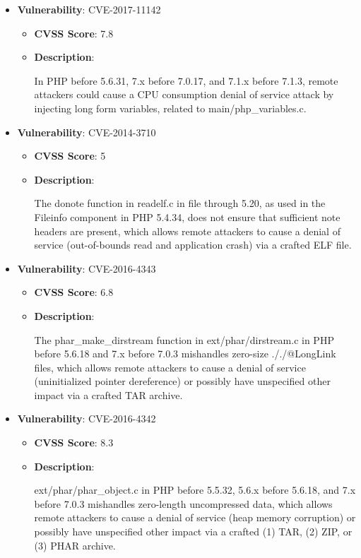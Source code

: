 \documentclass{article}
\begin{document}
\begin{itemize}
        \item \textbf{Vulnerability}: CVE-2017-11142
        \begin{itemize}
            \item \textbf{CVSS Score}:  7.8 
            \item \textbf{Description}:
            \parbox[t]{0.9\linewidth}{
                \ttfamily In PHP before 5.6.31, 7.x before 7.0.17, and 7.1.x before 7.1.3, remote attackers could cause a CPU consumption denial of service attack by injecting long form variables, related to main/php\_variables.c.
            }
        \end{itemize}
    
        \item \textbf{Vulnerability}: CVE-2014-3710
        \begin{itemize}
            \item \textbf{CVSS Score}:  5 
            \item \textbf{Description}:
            \parbox[t]{0.9\linewidth}{
                \ttfamily The donote function in readelf.c in file through 5.20, as used in the Fileinfo component in PHP 5.4.34, does not ensure that sufficient note headers are present, which allows remote attackers to cause a denial of service (out-of-bounds read and application crash) via a crafted ELF file.
            }
        \end{itemize}
    
        \item \textbf{Vulnerability}: CVE-2016-4343
        \begin{itemize}
            \item \textbf{CVSS Score}:  6.8 
            \item \textbf{Description}:
            \parbox[t]{0.9\linewidth}{
                \ttfamily The phar\_make\_dirstream function in ext/phar/dirstream.c in PHP before 5.6.18 and 7.x before 7.0.3 mishandles zero-size ././@LongLink files, which allows remote attackers to cause a denial of service (uninitialized pointer dereference) or possibly have unspecified other impact via a crafted TAR archive.
            }
        \end{itemize}
    
        \item \textbf{Vulnerability}: CVE-2016-4342
        \begin{itemize}
            \item \textbf{CVSS Score}:  8.3 
            \item \textbf{Description}:
            \parbox[t]{0.9\linewidth}{
                \ttfamily ext/phar/phar\_object.c in PHP before 5.5.32, 5.6.x before 5.6.18, and 7.x before 7.0.3 mishandles zero-length uncompressed data, which allows remote attackers to cause a denial of service (heap memory corruption) or possibly have unspecified other impact via a crafted (1) TAR, (2) ZIP, or (3) PHAR archive.
            }
        \end{itemize}
    

\end{itemize}
\end{document}
